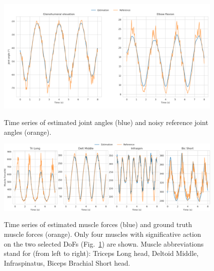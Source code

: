 \begin{figure}[t!]
\centering
\includegraphics[width=\textwidth]{figures/joint_angles_MHE.pdf}\\ 
\caption{Time series of estimated joint angles (blue) and noisy reference joint angles (orange).} 
\label{fig:joint_angles_MHE} 
\end{figure} 

\begin{figure}[t!] 
\centering 
\includegraphics[width=\textwidth]{figures/Muscle_Forces_MHE.pdf}\\ 
\caption{Time series of estimated muscle forces (blue) and ground truth muscle forces (orange). Only four muscles with significative action on the two selected DoFs (Fig.~\ref{fig:joint_angles_MHE}) are shown.
Muscle abbreviations stand for (from left to right): Triceps Long head, Deltoid Middle, Infraspinatus, Biceps Brachial Short head.}
\label{fig:muscle_forces_MHE} 
\end{figure} 

